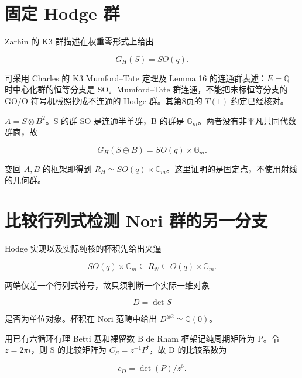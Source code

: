 \documentclass[11pt,a4paper,oneside]{ctexrep}
\theoremstyle{cnplain}
\theoremstyle{definition}
\theoremstyle{remark}
\newcommand{\Gm}{\mathbb G_m}
\begin{document}
\section{固定 Hodge 群}\label{sec:fixed:5}

Zarhin 的 K3 群描述在权重零形式上给出

\begin{equation}
G_H(S)=SO(q).                           \label{eq:fixed:9}
\end{equation}

可采用 Charles 的 K3 Mumford--Tate 定理及 Lemma 16 的连通群表述：\(E=\)\(\mathbb Q\) 时中心化群的恒等分支是 SO。Mumford--Tate 群连通，不能把未标恒等分支的 GO/O 符号机械照抄成不连通的 Hodge 群。其第8页的 \(T(1)\) 约定已经核对。

\(A=S\otimes B^{2}\)。S 的群 SO 是连通半单群，B 的群是 \(\mathbb G_m\)。两者没有非平凡共同代数群商，故

\begin{equation}
G_H(S\oplus B)=SO(q)\times\mathbb G_m.
\end{equation}

变回 $A,B$ 的框架即得到 $R_H\simeq SO(q)\times\Gm$。这里证明的是固定点，不使用射线的几何群。

\section{比较行列式检测 Nori 群的另一分支}\label{sec:fixed:6}

Hodge 实现以及实际纯核的杯积先给出夹逼

\begin{equation}
SO(q)\times\mathbb G_m
   \subseteq R_N
   \subseteq O(q)\times\mathbb G_m.                               \label{eq:fixed:10}
\end{equation}

两端仅差一个行列式符号，故只须判断一个实际一维对象

\begin{equation}
D=\det S
\end{equation}

是否为单位对象。杯积在 Nori 范畴中给出 \(D^{\otimes2}\simeq\mathbb Q(0)\)。

用已有六循环有理 Betti 基和裸留数 B de Rham 框架记纯周期矩阵为 P。令 \(z=2\pi i\)，则 S 的比较矩阵为 \(C_S=z^{-1}P^{\mathsf t}\)，故 D 的比较系数为

\begin{equation}
c_D=\det(P)/z^6.
\end{equation}
\end{document}
